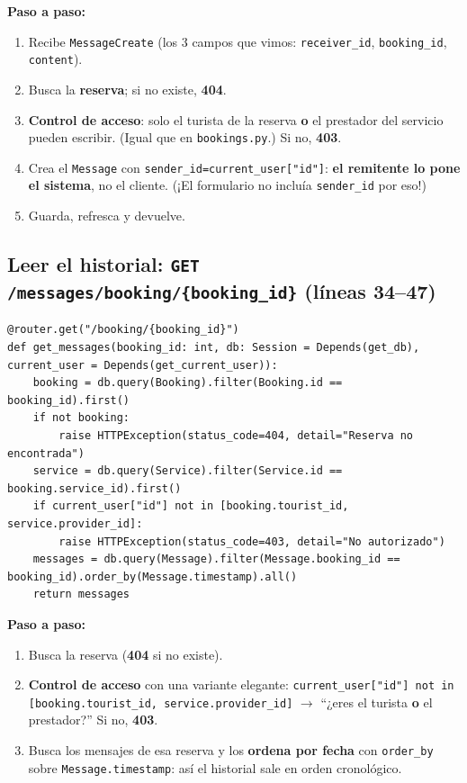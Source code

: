 \documentclass[11pt,a4paper]{article}
\begin{document}
\textbf{Paso a paso:}
\begin{enumerate}
    \item Recibe \texttt{MessageCreate} (los 3 campos que vimos: \texttt{receiver\_id},
    \texttt{booking\_id}, \texttt{content}).
    \item Busca la \textbf{reserva}; si no existe, \textbf{404}.
    \item \textbf{Control de acceso}: solo el turista de la reserva \textbf{o} el prestador del
    servicio pueden escribir. (Igual que en \texttt{bookings.py}.) Si no, \textbf{403}.
    \item Crea el \texttt{Message} con \texttt{sender\_id=current\_user["id"]}: \textbf{el remitente
    lo pone el sistema}, no el cliente. (¡El formulario no incluía \texttt{sender\_id} por eso!)
    \item Guarda, refresca y devuelve.
\end{enumerate}

\subsection{Leer el historial: \texttt{GET /messages/booking/\{booking\_id\}} (líneas 34--47)}

\begin{lstlisting}
@router.get("/booking/{booking_id}")
def get_messages(booking_id: int, db: Session = Depends(get_db), current_user = Depends(get_current_user)):
    booking = db.query(Booking).filter(Booking.id == booking_id).first()
    if not booking:
        raise HTTPException(status_code=404, detail="Reserva no encontrada")
    service = db.query(Service).filter(Service.id == booking.service_id).first()
    if current_user["id"] not in [booking.tourist_id, service.provider_id]:
        raise HTTPException(status_code=403, detail="No autorizado")
    messages = db.query(Message).filter(Message.booking_id == booking_id).order_by(Message.timestamp).all()
    return messages
\end{lstlisting}

\textbf{Paso a paso:}
\begin{enumerate}
    \item Busca la reserva (\textbf{404} si no existe).
    \item \textbf{Control de acceso} con una variante elegante:
    \texttt{current\_user["id"] not in [booking.tourist\_id, service.provider\_id]} $\rightarrow$
    ``¿eres el turista \textbf{o} el prestador?'' Si no, \textbf{403}.
    \item Busca los mensajes de esa reserva y los \textbf{ordena por fecha} con
    \texttt{order\_by} sobre \texttt{Message.timestamp}: así el historial sale en orden cronológico.
\end{enumerate}
\end{document}
